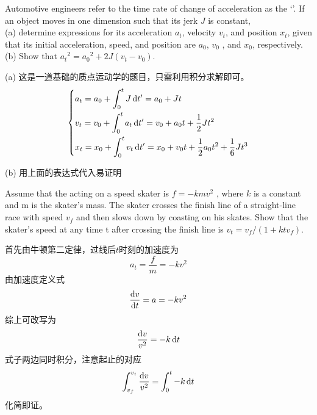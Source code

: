 \begin{solution}[质点运动学计算]
    Automotive engineers refer to the time rate of change
    of acceleration as the `'. If an object moves in one dimension such that its jerk $J$ is constant,\\
    (a) determine expressions for its acceleration $a_{t}$, velocity $v_{t}$, and position $x_{t}$, given that its initial acceleration, speed, and position are $a_{0}$, $ v_{0} $ , and $x_{0}$, respectively.\\
    (b) Show that $ a_{t}{}^ {2} = a_{0}{}^ {2}  +2J(  v_ {t}  -  v_ {0}  )$.

    \tcbrule

    (a) 这是一道基础的质点运动学的题目，只需利用积分求解即可。
    \[\left\{
        \begin{aligned}
             & a_{t}=a_{0}+\int_{0}^{t}J\dif t'=a_{0}+Jt                                                 \\
             & v_{t}=v_{0}+\int_{0}^{t}a_{t}\dif t'=v_{0}+a_{0}t+\frac{1}{2}Jt^{2}                       \\
             & x_{t}=x_{0}+\int_{0}^{t}v_{t}\dif t'=x_{0}+v_{0}t+\frac{1}{2}a_{0}t^{2}+\frac{1}{6}Jt^{3}
        \end{aligned}
        \right.\]

    (b) 用上面的表达式代入易证明
\end{solution}
\begin{solution}[质点动力学计算]
    Assume that the  acting on a speed skater
    is $f=- kmv^ {2} $ , where $k$ is a constant and m is the skater's
    mass. The skater crosses the finish line of a straight-line
    race with speed $ v_ {f } $ and then slows down by coasting on
    his skates. Show that the skater's speed at any time t
    after crossing the finish line is $v_{t} = v_ {f}  / (1+  ktv_ {f}  )$.


    首先由牛顿第二定律，过线后$t$时刻的加速度为
    \[
        a_{t}=\frac{f}{m}=-kv^{2}
    \]
    由加速度定义式
    \[
        \frac{\dif v}{\dif t}=a=-kv^{2}
    \]
    综上可改写为
    \[
        \frac{\dif v}{v^{2}}=-k\dif t
    \]
    式子两边同时积分，注意起止的对应
    \[
        \int_{v_{f}}^{v_{t}}\frac{\dif v}{v^{2}}=\int_{0}^{t}-k\dif t
    \]
    化简即证。
\end{solution}

